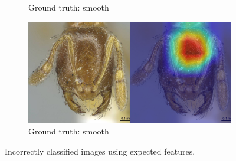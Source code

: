 \documentclass{aci}
\numberwithin{equation}{section}
\begin{document}
\begin{figure}
\begin{subfigure}{\subwidth}
        \caption{Ground truth: smooth}
        \label{fig:incorrect_ideal_177}
    \end{subfigure}
    \begin{subfigure}{\subwidth}
        \includegraphics[width=1\linewidth]{thesis_assets/gradcam/incorrect_ideal/197.png}
        \caption{Ground truth: smooth}
        \label{fig:incorrect_ideal_197}
    \end{subfigure}
    \caption{Incorrectly classified images using expected features.}
    \label{fig:incorrect_ideal}
\end{figure}
\end{document}
